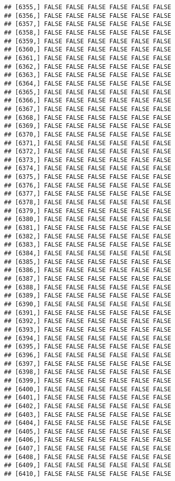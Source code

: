 \documentclass[
]{article}
\begin{document}
\begin{verbatim}
## [6355,] FALSE FALSE FALSE FALSE FALSE FALSE
## [6356,] FALSE FALSE FALSE FALSE FALSE FALSE
## [6357,] FALSE FALSE FALSE FALSE FALSE FALSE
## [6358,] FALSE FALSE FALSE FALSE FALSE FALSE
## [6359,] FALSE FALSE FALSE FALSE FALSE FALSE
## [6360,] FALSE FALSE FALSE FALSE FALSE FALSE
## [6361,] FALSE FALSE FALSE FALSE FALSE FALSE
## [6362,] FALSE FALSE FALSE FALSE FALSE FALSE
## [6363,] FALSE FALSE FALSE FALSE FALSE FALSE
## [6364,] FALSE FALSE FALSE FALSE FALSE FALSE
## [6365,] FALSE FALSE FALSE FALSE FALSE FALSE
## [6366,] FALSE FALSE FALSE FALSE FALSE FALSE
## [6367,] FALSE FALSE FALSE FALSE FALSE FALSE
## [6368,] FALSE FALSE FALSE FALSE FALSE FALSE
## [6369,] FALSE FALSE FALSE FALSE FALSE FALSE
## [6370,] FALSE FALSE FALSE FALSE FALSE FALSE
## [6371,] FALSE FALSE FALSE FALSE FALSE FALSE
## [6372,] FALSE FALSE FALSE FALSE FALSE FALSE
## [6373,] FALSE FALSE FALSE FALSE FALSE FALSE
## [6374,] FALSE FALSE FALSE FALSE FALSE FALSE
## [6375,] FALSE FALSE FALSE FALSE FALSE FALSE
## [6376,] FALSE FALSE FALSE FALSE FALSE FALSE
## [6377,] FALSE FALSE FALSE FALSE FALSE FALSE
## [6378,] FALSE FALSE FALSE FALSE FALSE FALSE
## [6379,] FALSE FALSE FALSE FALSE FALSE FALSE
## [6380,] FALSE FALSE FALSE FALSE FALSE FALSE
## [6381,] FALSE FALSE FALSE FALSE FALSE FALSE
## [6382,] FALSE FALSE FALSE FALSE FALSE FALSE
## [6383,] FALSE FALSE FALSE FALSE FALSE FALSE
## [6384,] FALSE FALSE FALSE FALSE FALSE FALSE
## [6385,] FALSE FALSE FALSE FALSE FALSE FALSE
## [6386,] FALSE FALSE FALSE FALSE FALSE FALSE
## [6387,] FALSE FALSE FALSE FALSE FALSE FALSE
## [6388,] FALSE FALSE FALSE FALSE FALSE FALSE
## [6389,] FALSE FALSE FALSE FALSE FALSE FALSE
## [6390,] FALSE FALSE FALSE FALSE FALSE FALSE
## [6391,] FALSE FALSE FALSE FALSE FALSE FALSE
## [6392,] FALSE FALSE FALSE FALSE FALSE FALSE
## [6393,] FALSE FALSE FALSE FALSE FALSE FALSE
## [6394,] FALSE FALSE FALSE FALSE FALSE FALSE
## [6395,] FALSE FALSE FALSE FALSE FALSE FALSE
## [6396,] FALSE FALSE FALSE FALSE FALSE FALSE
## [6397,] FALSE FALSE FALSE FALSE FALSE FALSE
## [6398,] FALSE FALSE FALSE FALSE FALSE FALSE
## [6399,] FALSE FALSE FALSE FALSE FALSE FALSE
## [6400,] FALSE FALSE FALSE FALSE FALSE FALSE
## [6401,] FALSE FALSE FALSE FALSE FALSE FALSE
## [6402,] FALSE FALSE FALSE FALSE FALSE FALSE
## [6403,] FALSE FALSE FALSE FALSE FALSE FALSE
## [6404,] FALSE FALSE FALSE FALSE FALSE FALSE
## [6405,] FALSE FALSE FALSE FALSE FALSE FALSE
## [6406,] FALSE FALSE FALSE FALSE FALSE FALSE
## [6407,] FALSE FALSE FALSE FALSE FALSE FALSE
## [6408,] FALSE FALSE FALSE FALSE FALSE FALSE
## [6409,] FALSE FALSE FALSE FALSE FALSE FALSE
## [6410,] FALSE FALSE FALSE FALSE FALSE FALSE

\end{verbatim}
\end{document}
